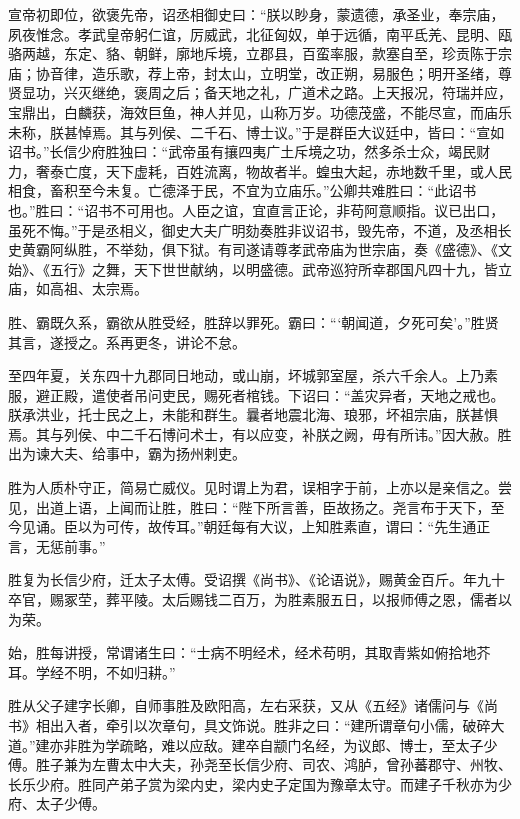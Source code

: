 \documentclass[12pt,UTF8]{ctexbook}
\begin{document}
宣帝初即位，欲褒先帝，诏丞相御史曰：“朕以眇身，蒙遗德，承圣业，奉宗庙，夙夜惟念。孝武皇帝躬仁谊，厉威武，北征匈奴，单于远循，南平氐羌、昆明、瓯骆两越，东定、貉、朝鲜，廓地斥境，立郡县，百蛮率服，款塞自至，珍贡陈于宗庙；协音律，造乐歌，荐上帝，封太山，立明堂，改正朔，易服色；明开圣绪，尊贤显功，兴灭继绝，褒周之后；备天地之礼，广道术之路。上天报况，符瑞并应，宝鼎出，白麟获，海效巨鱼，神人并见，山称万岁。功德茂盛，不能尽宣，而庙乐未称，朕甚悼焉。其与列侯、二千石、博士议。”于是群臣大议廷中，皆曰：“宣如诏书。”长信少府胜独曰：“武帝虽有攘四夷广土斥境之功，然多杀士众，竭民财力，奢泰亡度，天下虚耗，百姓流离，物故者半。蝗虫大起，赤地数千里，或人民相食，畜积至今未复。亡德泽于民，不宜为立庙乐。”公卿共难胜曰：“此诏书也。”胜曰：“诏书不可用也。人臣之谊，宜直言正论，非苟阿意顺指。议已出口，虽死不悔。”于是丞相义，御史大夫广明劾奏胜非议诏书，毁先帝，不道，及丞相长史黄霸阿纵胜，不举劾，俱下狱。有司遂请尊孝武帝庙为世宗庙，奏《盛德》、《文始》、《五行》之舞，天下世世献纳，以明盛德。武帝巡狩所幸郡国凡四十九，皆立庙，如高祖、太宗焉。



胜、霸既久系，霸欲从胜受经，胜辞以罪死。霸曰：“‘朝闻道，夕死可矣’。”胜贤其言，遂授之。系再更冬，讲论不怠。



至四年夏，关东四十九郡同日地动，或山崩，坏城郭室屋，杀六千余人。上乃素服，避正殿，遣使者吊问吏民，赐死者棺钱。下诏曰：“盖灾异者，天地之戒也。朕承洪业，托士民之上，未能和群生。曩者地震北海、琅邪，坏祖宗庙，朕甚惧焉。其与列侯、中二千石博问术士，有以应变，补朕之阙，毋有所讳。”因大赦。胜出为谏大夫、给事中，霸为扬州剌吏。



胜为人质朴守正，简易亡威仪。见时谓上为君，误相字于前，上亦以是亲信之。尝见，出道上语，上闻而让胜，胜曰：“陛下所言善，臣故扬之。尧言布于天下，至今见诵。臣以为可传，故传耳。”朝廷每有大议，上知胜素直，谓曰：“先生通正言，无惩前事。”



胜复为长信少府，迁太子太傅。受诏撰《尚书》、《论语说》，赐黄金百斤。年九十卒官，赐冢茔，葬平陵。太后赐钱二百万，为胜素服五日，以报师傅之恩，儒者以为荣。



始，胜每讲授，常谓诸生曰：“士病不明经术，经术苟明，其取青紫如俯拾地芥耳。学经不明，不如归耕。”



胜从父子建字长卿，自师事胜及欧阳高，左右采获，又从《五经》诸儒问与《尚书》相出入者，牵引以次章句，具文饰说。胜非之曰：“建所谓章句小儒，破碎大道。”建亦非胜为学疏略，难以应敌。建卒自颛门名经，为议郎、博士，至太子少傅。胜子兼为左曹太中大夫，孙尧至长信少府、司农、鸿胪，曾孙蕃郡守、州牧、长乐少府。胜同产弟子赏为梁内史，梁内史子定国为豫章太守。而建子千秋亦为少府、太子少傅。
\end{document}
